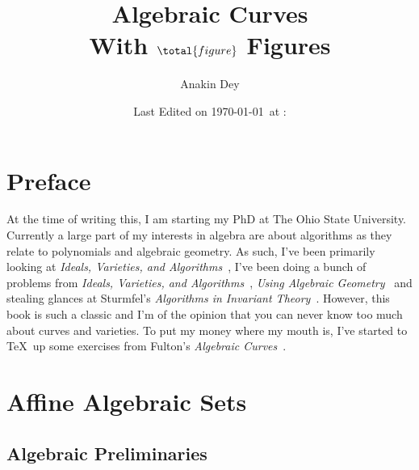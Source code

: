\documentclass[letterpaper, 11pt, oneside]{book}
\title{\vspace{-100pt} {\Huge Algebraic Curves} \\ {\small With $\total{figure}$ Figures}}
\author{\Large Anakin Dey}
\date{\small Last Edited on \today\ at \DTMfetchhour{now}:\DTMfetchminute{now}}
\newcommand{\CoverName}{Cover}
\begin{document}
\frontmatter
\renewcommand{\thepage}{\CoverName}
\maketitle


\tableofcontents
\clearpage


%

\chapter*{Preface}

At the time of writing this, I am starting my PhD at The Ohio State University.
Currently a large part of my interests in algebra are about algorithms as they relate to polynomials and algebraic geometry.
As such, I've been primarily looking at \emph{Ideals, Varieties, and Algorithms}~\cite{book:IVA},
I've been doing a bunch of problems from \emph{Ideals, Varieties, and Algorithms}~\cite{book:IVA}, \emph{Using Algebraic Geometry}~\cite{book:UAG} and stealing glances at Sturmfel's \emph{Algorithms in Invariant Theory}~\cite{book:AlgosInInvTheory}.
However, this book is such a classic and I'm of the opinion that you can never know too much about curves and varieties.
To put my money where my mouth is, I've started to \TeX\ up some exercises from Fulton's \emph{Algebraic Curves}~\cite{book:Curves}.

\mainmatter

\chapter{Affine Algebraic Sets}

\section{Algebraic Preliminaries}
\end{document}
